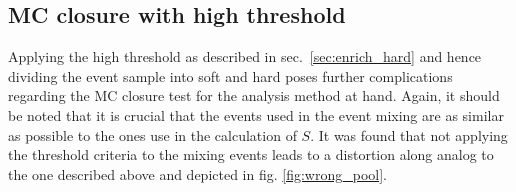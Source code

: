 \subsection[MC closure with high \pt threshold]{MC closure with high \ptbold threshold}
\label{sec:closure_with_thresh}

Applying the high \pt threshold \ptthresh as described in sec.~\ref{sec:enrich_hard} and hence dividing the event sample into \gls{soft} and \gls{hard} poses further complications regarding the MC closure test for the analysis method at hand. Again, it should be noted that it is crucial that the events used in the event mixing are as similar as possible to the ones use in the calculation of $S$. It was found that not applying the threshold criteria to the mixing events leads to a distortion along \deta analog to the one described above and depicted in fig. \ref{fig:wrong_pool}. 

